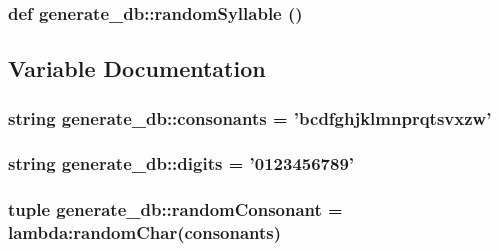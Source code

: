 \hypertarget{namespacegenerate__db_a879a1152e7cdd1180bcbe74c9de624a}{
\subsubsection[{randomSyllable}]{\setlength{\rightskip}{0pt plus 5cm}def generate\_\-db::randomSyllable ()}}
\label{namespacegenerate__db_a879a1152e7cdd1180bcbe74c9de624a}




\subsection{Variable Documentation}
\hypertarget{namespacegenerate__db_f595dc1a1f93187bf83045c7811adab2}{
\subsubsection[{consonants}]{\setlength{\rightskip}{0pt plus 5cm}string {\bf generate\_\-db::consonants} = 'bcdfghjklmnprqtsvxzw'}}
\label{namespacegenerate__db_f595dc1a1f93187bf83045c7811adab2}


\hypertarget{namespacegenerate__db_1e0c49b7b44537be906cbfca51cb8543}{
\subsubsection[{digits}]{\setlength{\rightskip}{0pt plus 5cm}string {\bf generate\_\-db::digits} = '0123456789'}}
\label{namespacegenerate__db_1e0c49b7b44537be906cbfca51cb8543}


\hypertarget{namespacegenerate__db_0e0c66e62d599846a54ee0851e25fb4c}{
\subsubsection[{randomConsonant}]{\setlength{\rightskip}{0pt plus 5cm}tuple {\bf generate\_\-db::randomConsonant} = lambda:randomChar({\bf consonants})}}
\label{namespacegenerate__db_0e0c66e62d599846a54ee0851e25fb4c}


